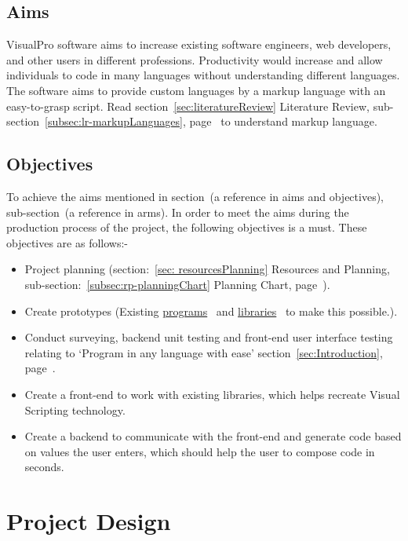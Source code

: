 \documentclass[conference]{IEEEtran}
\begin{document}
      \subsection{Aims}
        VisualPro software aims to increase existing software engineers, web developers, and other users in different professions. Productivity would increase and allow individuals to code in many languages without understanding different languages. The software aims to provide custom languages by a markup language with an easy-to-grasp script. Read section~\ref{sec:literatureReview} Literature Review, sub-section~\ref{subsec:lr-markupLanguages}, page~\pageref{subsec:lr-markupLanguages} to understand markup language.
      \subsection{Objectives}
        To achieve the aims mentioned in section~(a reference in aims and objectives), sub-section~(a reference in arms). In order to meet the aims during the production process of the project, the following objectives is a must. These objectives are as follows:-
        \begin{itemize}
          \item Project planning (section:~\ref{sec: resourcesPlanning} Resources and Planning, sub-section:~\ref{subsec:rp-planningChart} Planning Chart, page~\pageref{subsec:rp-planningChart}).
          \item Create prototypes (Existing \href{https://github.com/ShinkuKira21/VisualPro-FinalProject/tree/main/Experience}{programs}~\cite{patch_programming_2021} and \href{https://github.com/ShinkuKira21/VisualPro-FinalProject/tree/main/Libraries}{libraries}~\cite{patch_libraries_2021} to make this possible.).
          \item Conduct surveying, backend unit testing and front-end user interface testing relating to `Program in any language with ease' section~\ref{sec:Introduction}, page~\pageref{sec:Introduction}.
          \item Create a front-end to work with existing libraries, which helps recreate Visual Scripting technology.
          \item Create a backend to communicate with the front-end and generate code based on values the user enters, which should help the user to compose code in seconds.
        \end{itemize}
      
    \section{Project Design}
\end{document}
